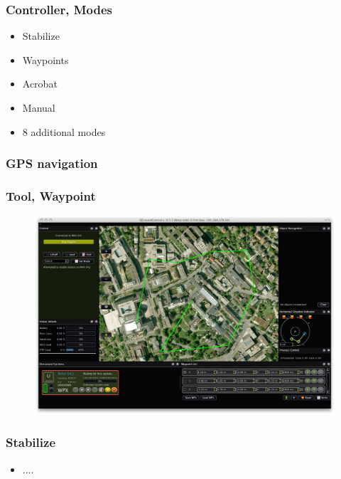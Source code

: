 \begin{frame}
\frametitle{Controller, Modes}

  \begin{itemize}
    \item Stabilize    
    \item Waypoints   
	\item Acrobat
	\item Manual 
	\item 8 additional modes 

  \end{itemize}
  
\end{frame}

\begin{frame}
\frametitle{GPS navigation}

  
\end{frame}

\begin{frame}
\frametitle{Tool, Waypoint}

  \begin{figure}
  \includegraphics[scale=0.2]{pic/03_our-copter/qgroundcontrol.png}
  \end{figure}
\end{frame}

\begin{frame}
\frametitle{Stabilize}

  \begin{itemize}
    \item ....    
  \end{itemize}
\end{frame}

